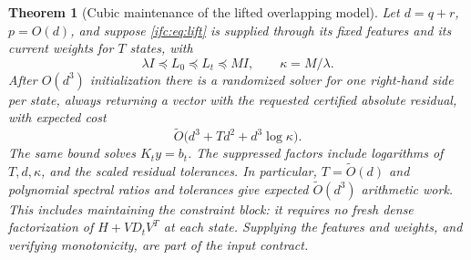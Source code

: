 \documentclass[11pt]{amsart}
\newtheorem{theorem}{Theorem}[section]
\theoremstyle{definition}\newtheorem{definition}[theorem]{Definition}
\theoremstyle{remark}\newtheorem{remark}[theorem]{Remark}
\numberwithin{equation}{section}
\begin{document}
\begin{theorem}[Cubic maintenance of the lifted overlapping model]
\label{ifc:thm:cubic}
Let $d=q+r$, $p=O(d)$, and suppose \eqref{ifc:eq:lift} is supplied through
its fixed features and its current weights for $T$ states, with
\[
 \lambda I\preceq L_0\preceq L_t\preceq M I,
 \qquad \kappa=M/\lambda.
\]
After $O(d^3)$ initialization there is a randomized solver for one
right-hand side per state, always returning a vector with the requested
certified absolute residual, with expected cost
\begin{equation}\label{ifc:eq:cost}
 \widetilde O\bigl(d^3+Td^2+d^3\log\kappa\bigr).
\end{equation}
The same bound solves $K_ty=b_t$. The suppressed factors include
logarithms of $T,d,\kappa$, and the scaled residual tolerances.
In particular, $T=\widetilde O(d)$ and polynomial spectral ratios and
tolerances give expected $\widetilde O(d^3)$ arithmetic work.
This includes maintaining the constraint block: it requires no fresh
dense factorization of $H+VD_tV^T$ at each state. Supplying the features
and weights, and verifying monotonicity, are part of the input contract.
\end{theorem}
\end{document}
